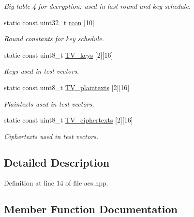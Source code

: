 \begin{DoxyCompactItemize}
\begin{DoxyCompactList}\small\item\em Big table 4 for decryption\+: used in last round and key schedule. \end{DoxyCompactList}\item 
static const uint32\+\_\+t \hyperlink{classAES_a5f6082649a62bd52938c6b3b4c5a526f}{rcon} \mbox{[}10\mbox{]}
\begin{DoxyCompactList}\small\item\em Round constants for key schedule. \end{DoxyCompactList}\item 
static const uint8\+\_\+t \hyperlink{classAES_af860c29be27726f8ad48a420c5724692}{T\+V\+\_\+keys} \mbox{[}2\mbox{]}\mbox{[}16\mbox{]}
\begin{DoxyCompactList}\small\item\em Keys used in test vectors. \end{DoxyCompactList}\item 
static const uint8\+\_\+t \hyperlink{classAES_a9e58e7326fc7597ebed6185191015378}{T\+V\+\_\+plaintexts} \mbox{[}2\mbox{]}\mbox{[}16\mbox{]}
\begin{DoxyCompactList}\small\item\em Plaintexts used in test vectors. \end{DoxyCompactList}\item 
static const uint8\+\_\+t \hyperlink{classAES_aaa75b4b36597677f162e2752d6c2b407}{T\+V\+\_\+ciphertexts} \mbox{[}2\mbox{]}\mbox{[}16\mbox{]}
\begin{DoxyCompactList}\small\item\em Ciphertexts used in test vectors. \end{DoxyCompactList}\end{DoxyCompactItemize}


\subsection{Detailed Description}


Definition at line 14 of file aes.\+hpp.



\subsection{Member Function Documentation}
\hypertarget{classAES_a81b2fbb6ef1422b54e4ca552a2cc36e4}{}

